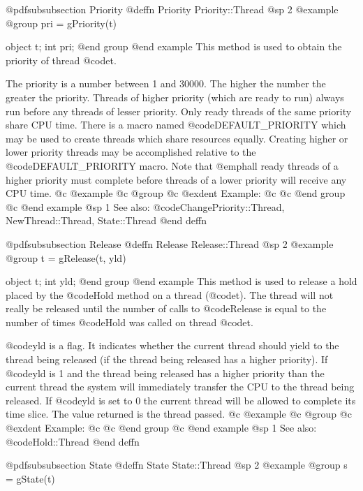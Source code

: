 @pdfsubsubsection {Priority}
@deffn {Priority} Priority::Thread
@sp 2
@example
@group
pri = gPriority(t)

object  t;
int     pri;
@end group
@end example
This method is used to obtain the priority of thread @code{t}.

The priority is a number between 1 and 30000.  The higher the number the
greater the priority.  Threads of higher priority (which are ready to
run) always run before any threads of lesser priority.  Only ready
threads of the same priority share CPU time.  There is a macro named
@code{DEFAULT_PRIORITY} which may be used to create threads which share
resources equally.  Creating higher or lower priority threads may be
accomplished relative to the @code{DEFAULT_PRIORITY} macro.  Note that
@emph{all} ready threads of a higher priority must complete before
threads of a lower priority will receive any CPU time.
@c @example
@c @group
@c @exdent Example:
@c 
@c @end group
@c @end example
@sp 1
See also:  @code{ChangePriority::Thread, NewThread::Thread, State::Thread}
@end deffn









@pdfsubsubsection {Release}
@deffn {Release} Release::Thread
@sp 2
@example
@group
t = gRelease(t, yld)

object  t;
int     yld;
@end group
@end example
This method is used to release a hold placed by the @code{Hold}
method on a thread (@code{t}).  The thread will not really be released
until the number of calls to @code{Release} is equal to the number
of times @code{Hold} was called on thread @code{t}.

@code{yld} is a flag.  It indicates whether the current thread should
yield to the thread being released (if the thread being released has a
higher priority).  If @code{yld} is 1 and the thread being released has
a higher priority than the current thread the system will immediately
transfer the CPU to the thread being released.  If @code{yld} is set to
0 the current thread will be allowed to complete its time slice.  The
value returned is the thread passed.
@c @example
@c @group
@c @exdent Example:
@c 
@c @end group
@c @end example
@sp 1
See also:  @code{Hold::Thread}
@end deffn







@pdfsubsubsection {State}
@deffn {State} State::Thread
@sp 2
@example
@group
s = gState(t)

